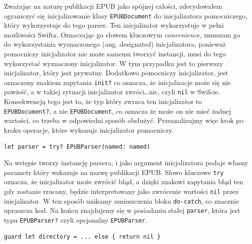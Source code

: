 Zważając na naturę publikacji EPUB jako spójnej całości, zdecydowałem ograniczyć się inicjalizowanie klasy \texttt{EPUBDocument} do inicjalizatora pomocniczego, który wykorzystuje do tego parser. Ten inicjalizator wykorzystuje w pełni możliwości Swifta. Oznaczając go słowem kluczowym \textit{convenience}, zmuszam go do wykorzystania wyznaczonego (ang. designated) inicjalizatora, ponieważ pomocniczy inicjalizator nie może samemu tworzyć instancji, musi do tego wykorzystać wyznaczony inicjalizator. W tym przypadku jest to pierwszy inicjalizator, który jest prywatny. Dodatkowo pomocniczy inicjalizator, jest oznaczony znakiem zapytania \texttt{init?} co oznacza, że inicjalizacje może się nie powieść, a w takiej sytuacji inicjalizator zwróci\ldots nic, czyli \texttt{nil} w Swifcie. Konsekwencją tego jest to, że typ który zwraca ten inicjalizator to \texttt{EPUBDocument?}, a nie \texttt{EPUBDocument}, co oznacza że może on nie mieć żadnej wartości, co trzeba w odpowiedni sposób obsłużyć. Przeanalizujmy więc krok po kroku operacje, które wykonuje inicjalizator pomocniczy.

\begin{lstlisting}[language=swift-reference,label=abcdedefs,caption=adsaa]
let parser = try? EPUBParser(named: named)
\end{lstlisting}

Na wstępie tworzy instancję parsera, i jako argument inicjalizatora podaje własny parametr który wskazuje na nazwę publikacji EPUB. Słowo kluczowe \texttt{try} oznacza, że inicjalizator może zwrócić błąd, a dzięki znakowi zapytania błąd ten gdy zostanie rzucony, będzie interpretowany jako zwrócenie wartości \texttt{nil} przez inicjalizator. W ten sposób unikamy umieszczenia bloku \texttt{do-catch}, co znacznie upraszcza kod. Na końcu znajdujemy się w posiadaniu stałej \texttt{parser}, która jest typu \texttt{EPUBParser?} czyli opcjonalny \texttt{EPUBParser}.

\begin{lstlisting}[language=swift-reference,label=gggg,caption=dsadsda]
guard let directory = ... else { return nil }
\end{lstlisting}

